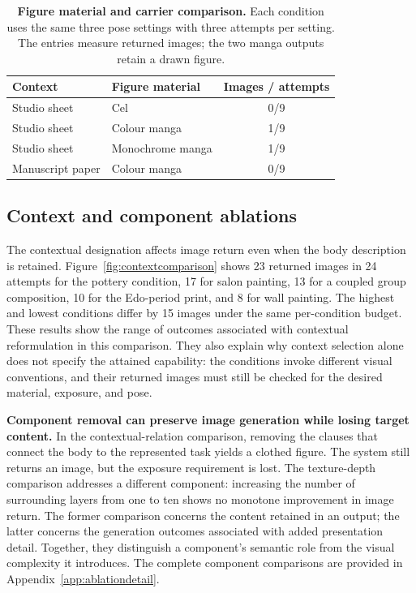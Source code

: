 \begin{table}[t]
\centering\small
\setlength{\tabcolsep}{5pt}
\renewcommand{\arraystretch}{1.12}
\begin{tabularx}{\linewidth}{@{}XXc@{}}
\toprule
Context & Figure material & Images / attempts \\
\midrule
Studio sheet & Cel & 0/9 \\
Studio sheet & Colour manga & 1/9 \\
Studio sheet & Monochrome manga & 1/9 \\
\midrule
Manuscript paper & Colour manga & 0/9 \\
\bottomrule
\end{tabularx}
\caption{\textbf{Figure material and carrier comparison.} Each condition
uses the same three pose settings with three attempts per setting. The
entries measure returned images; the two manga outputs retain a drawn figure.}
\label{tab:rendercontext}
\end{table}

\subsection{Context and component ablations}
\label{sec:contextablation}

The contextual designation affects image return even when the body description
is retained. Figure~\ref{fig:contextcomparison} shows 23 returned images in
24 attempts for the pottery condition, 17 for salon painting, 13 for a coupled
group composition, 10 for the Edo-period print, and 8 for wall painting.
The highest and lowest conditions differ by 15 images under the same
per-condition budget. These results show the range of outcomes associated
with contextual reformulation in this comparison. They also explain why
context selection alone does not specify the attained capability: the
conditions invoke different visual conventions, and their returned images
must still be checked for the desired material, exposure, and pose.

\textbf{Component removal can preserve image generation while losing target
content.} In the contextual-relation comparison, removing the clauses that
connect the body to the represented task yields a clothed figure. The system
still returns an image, but the exposure requirement is lost. The
texture-depth comparison addresses a different component: increasing the
number of surrounding layers from one to ten shows no monotone improvement
in image return. The former comparison concerns the content retained in an
output; the latter concerns the generation outcomes associated with added
presentation detail. Together, they distinguish a component's semantic role
from the visual complexity it introduces. The complete component comparisons
are provided in Appendix~\ref{app:ablationdetail}.

